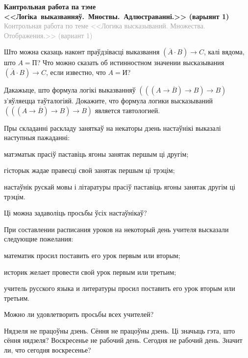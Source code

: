 



\begin{center}
	\textbf{Кантрольная работа па тэме <<Логіка~выказванняў.~Мноствы.~Адлюстраванні.>> (варыянт 1)} \\
	{\small \textcolor{darkgray}{Контрольная работа по теме <<Логика высказываний. Множества. Отображения.>> (вариант 1)}}
\end{center}


\begin{problemList}
	
\problemItemSimple
{Што можна сказаць наконт праўдзівасці выказвання $(\overline{A} \cdot B) \to C$, калі вядома, што $A = \mbox{П}$?}
{Что можно сказать об истинностном значении высказывания $(\overline{A} \cdot B) \to C$, если известно, что $A = \mbox{И}$?}

\problemItemSimple
{Дакажыце, што формула логікі выказванняў $(((A \to \overline{B}) \to B) \to B)$ з'яўляецца таўталогіяй.}
{Докажите, что формула логики высказываний $(((A \to \overline{B}) \to B) \to B)$ является тавтологией.}

\problemItemSimple
{Пры складанні раскладу заняткаў на некаторы дзень настаўнікі выказалі наступныя пажаданні:
\begin{belarusianEnumerate}
	\item матэматык прасіў паставіць ягоны занятак першым ці другім;
	\item гісторык жадае правесці свой занятак першым ці трэцім;
	\item настаўнік рускай мовы і літаратуры прасіў паставіць ягоны занятак другім ці трэцім.
\end{belarusianEnumerate}
Ці можна задаволіць просьбы ўсіх настаўнікаў?}
{При составлении расписания уроков на некоторый день учителя высказали следующие пожелания:
\begin{russianEnumerate}
	\item математик просил поставить его урок первым или вторым;
	\item историк желает провести свой урок первым или третьим;
	\item учитель русского языка и литературы просил поставить его урок вторым или третьим.
\end{russianEnumerate}
Можно ли удовлетворить просьбы всех учителей?}

\problemItemSimple
{Нядзеля не працоўны дзень. Сёння не працоўны дзень. Ці значыць гэта, што сёння нядзеля?}
{Воскресенье не рабочий день. Сегодня не рабочий день. Значит ли, что сегодня воскресенье?}


\end{problemList}
